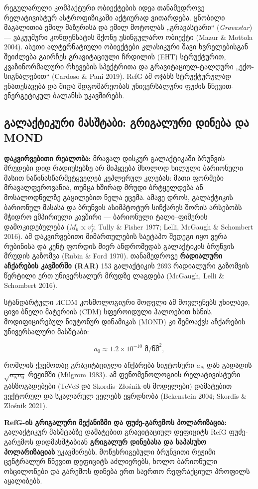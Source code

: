\documentclass[11pt,a4paper]{article}
\begin{document}
რეგულარული კომპაქტური ობიექტების იდეა თანამედროვე რელატივისტურ ასტროფიზიკაში აქტიურად ვითარდება. ცნობილი მაგალითია ემილ მაზურისა და ემილ მოტოლას „გრავასტარი“ (\emph{Gravastar}) — ვაკუუმური კონდენსატის მქონე უსინგულარო ობიექტი (Mazur \& Mottola 2004). ასეთი ალტერნატიული ობიექტები კლასიკური შავი ხვრელებისგან შეიძლება გაირჩეს გრავიტაციული ჩრდილის (EHT) სტრუქტურით, კვაზინორმალური რხევების სპექტრითა და გრავიტაციულ-ტალღური „ექო-სიგნალებით“ (Cardoso \& Pani 2019). RefG ამ ოჯახს სტრუქტურულად ენათესავება და შიდა მდგომარეობას უნივერსალური ფუძის წნევით-ენერგეტიკულ ბალანსს უკავშირებს.


\subsection{გალაქტიკური მასშტაბი: გრიგალური დინება და MOND}

\textbf{დაკვირვებითი რეალობა:} მრავალ დისკურ გალაქტიკაში ბრუნვის მრუდები დიდ რადიუსებზე არ მიჰყვება მხოლოდ ხილული ბარიონული მასით ნაწინასწარმეტყველებ კეპლერულ კლებას: მათი ფორმები მრავალფეროვანია, თუმცა ხშირად მრუდი ბრტყელდება ან მოსალოდნელზე გაცილებით ნელა ეცემა. ამავე დროს, გალაქტიკის ბარიონულ მასასა და ბრუნვის ასიმპტოტურ სიჩქარეს შორის არსებობს მჭიდრო ემპირიული კავშირი — ბარიონული ტალი–ფიშერის დამოკიდებულება ($M_b \propto v_f^4$; Tully \& Fisher 1977; Lelli, McGaugh \& Schombert 2016). ამ დაკვირვებითი მიმართულების საეტაპო შედეგი იყო ვერა რუბინისა და კენტ ფორდის მიერ ანდრომედას გალაქტიკის ბრუნვის მრუდის გაზომვა (Rubin \& Ford 1970). თანამედროვე \textbf{რადიალური აჩქარების კავშირში (RAR)} 153 გალაქტიკის 2693 რადიალური გაზომვის წერტილი ერთ უნივერსალურ მრუდზე ლაგდება (McGaugh, Lelli \& Schombert 2016).

სტანდარტული $\Lambda$CDM კოსმოლოგიური მოდელი ამ მოვლენებს უხილავი, ცივი ბნელი მატერიის (CDM) სფეროიდული ჰალოებით ხსნის. მოდიფიცირებულ ნიუტონურ დინამიკას (MOND) კი შემოაქვს აჩქარების უნივერსალური მასშტაბი:

\[
a_0 \approx 1.2 \times 10^{-10} \text{ მ/წმ}^2,
\]

რომლის ქვემოთაც გრავიტაციული აჩქარება ნიუტონური $a_N$-დან გადადის $\sqrt{a_N a_0}$ რეჟიმში (Milgrom 1983). ამ ფენომენოლოგიის რელატივისტური განზოგადებები (TeVeS და Skordis–Złośnik-ის მოდელები) დამატებით ვექტორულ და სკალარულ ველებს ეყრდნობა (Bekenstein 2004; Skordis \& Złośnik 2021).

\textbf{RefG-ის გრიგალური მექანიზმი და ფუძე-გარემოს პოლარიზაცია:} გალაქტიკურ მასშტაბზე დამატებით გრავიტაციულ დეფიციტს RefG ფუძე-გარემოს დიდმასშტაბიან \textbf{გრიგალურ დინებასა და საპასუხო პოლარიზაციას} უკავშირებს. მოწესრიგებული ბრუნვითი რეჟიმი ცენტრალურ წნევით დეფიციტს აძლიერებს, ხოლო ბარიონული ოსცილონები და გარემოს დინება ერთ საერთო რეფრაქციულ პროფილს აყალიბებს.
\end{document}
